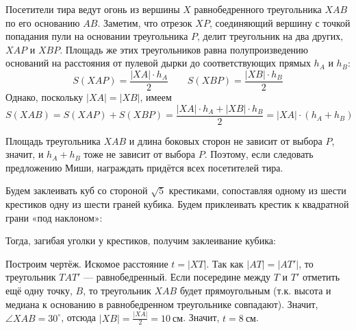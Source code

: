 \begin{itemize}
\itA Посетители тира ведут огонь из вершины $X$ равнобедренного треугольника $XAB$ по его основанию
$AB$. Заметим, что отрезок $XP$, соединяющий вершину с точкой попадания пули на основании 
треугольника $P$,
делит треугольник на два других, $XAP$ и $XBP$. Площадь же этих треугольников равна полупроизведению 
оснований на расстояния от пулевой дырки до соответствующих прямых $h_A$ и $h_B$: 
$$S(XAP) = \frac{|XA|\cdot h_A}{2}\quad\quad
S(XBP) = \frac{|XB|\cdot h_B}{2}$$ 
Однако, поскольку $|XA|=|XB|$, имеем
$$S(XAB) = S(XAP) + S(XBP) = \frac{|XA|\cdot h_A + |XB|\cdot h_B}{2} = |XA|\cdot (h_A + h_B)$$

Площадь треугольника $XAB$ и длина боковых сторон не зависит от выбора $P$, значит, и $h_A + h_B$
тоже не зависит от выбора $P$. Поэтому, если следовать предложению Миши, награждать придётся
всех посетителей тира.

\itB Будем заклеивать куб со стороной $\sqrt 5$ крестиками, сопоставляя одному из шести крестиков 
одну из шести граней кубика. Будем приклеивать крестик к квадратной грани «под наклоном»:

\begin{center}
\end{center}

Тогда, загибая уголки у крестиков, получим заклеивание кубика:

\begin{center}
\end{center}

\itC Построим чертёж. Искомое расстояние $t = |XT|$. Так как $|AT| = |AT'|$, то треугольник $TAT'$ --- 
равнобедренный. Если посередине между $T$ и $T'$ отметить ещё одну точку,
$B$, то треугольник $XAB$ будет прямоугольным (т.к. высота и медиана к основанию в равнобедренном треугольнике 
совпадают). Значит, $\angle XAB = 30^\circ$, отсюда $|XB| = \frac{|XA|}{2} = \SI{10}{\text{см}}$.
Значит, $t = \SI{8}{\textrm{см}}$.


\end{itemize}
